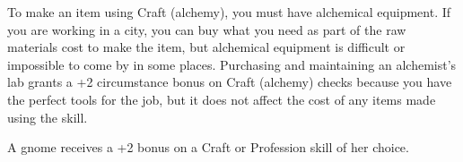 To make an item using Craft (alchemy), you must have alchemical equipment. If you are working in a city, you can buy what you need as part of the raw materials cost to make the item, but alchemical equipment is difficult or impossible to come by in some places. Purchasing and maintaining an alchemist's lab grants a +2 circumstance bonus on Craft (alchemy) checks because you have the perfect tools for the job, but it does not affect the cost of any items made using the skill.
				
A gnome receives a +2 bonus on a Craft or Profession skill of her choice.
        	
